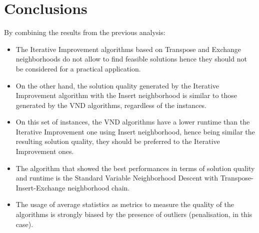 \documentclass{article}
\begin{document}




\section{Conclusions}
By combining the results from the previous analysis:
\begin{itemize}
  \item The Iterative Improvement algorithms based on Transpose and Exchange neighborhoods do not allow to find feasible solutions hence they should not be considered for a practical application.
  \item On the other hand, the solution quality generated by the Iterative Improvement algorithm with the Insert neighborhood is similar to those generated by the VND algorithms, regardless of the instances.
  \item On this set of instances, the VND algorithms have a lower runtime than the Iterative Improvement one using Insert neighborhood, hence being similar the resulting solution quality, they should be preferred to the Iterative Improvement ones.
  \item The algorithm that showed the best performances in terms of solution quality and runtime is the Standard Variable Neighborhood Descent with Transpose-Insert-Exchange neighborhood chain.
  \item The usage of average statistics as metrics to measure the quality of the algorithms is strongly biased by the presence of outliers (penalisation, in this case).
\end{itemize}





\end{document}
